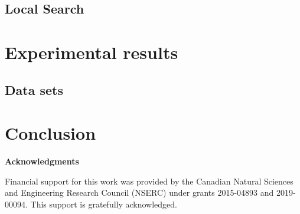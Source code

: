 \documentclass{article}
\begin{document}
\subsection*{ Local Search}




\section{ Experimental results}
\label{comp_exp}

\subsection{Data sets}

\section{Conclusion}
\label{concl}

\vspace{0.1in}


\vspace{1.5cm} \noindent \textbf{Acknowledgments}

Financial support for this work was provided by the Canadian Natural Sciences and Engineering Research Council (NSERC) under grants 2015-04893 and 2019-00094. This support is gratefully acknowledged.




\end{document}
